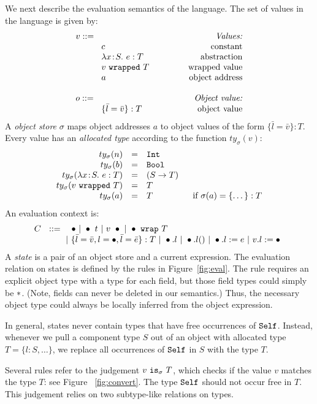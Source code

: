 \documentclass{article}
\newcommand{\lam}[4]{\lambda#1\!:\!#2.\,\,#4:#3}
\newcommand{\lamt}[2]{#1\rightarrow #2}
\newcommand{\app}[2]{#1~#2}
\newcommand{\Int}{\t{Int}}
\newcommand{\Bool}{\t{Bool}}
\newcommand{\dynamic}{\t{*}}
\newcommand{\hole}{\bullet}
\renewcommand{\t}[1]{{\tt #1}}
\newcommand{\objty}[1]{\{#1\}}
\newcommand{\obje}[2]{\{#1\}:{#2}}
\newcommand{\objget}[2]{#1.#2}
\newcommand{\objcall}[2]{#1.#2()}
\newcommand{\objset}[3]{#1.#2:=#3}
\newcommand{\wrapv}[2]{#1~\t{wrapped}~#2}
\newcommand{\wrap}[2]{#1~\t{wrap}~#2}
\newcommand{\allocty}[1]{ty_{\sigma}(#1)}
\newcommand{\istype}[2]{#1~\t{is}_{\sigma}~ #2}
\newcommand{\self}{\t{Self}}
\begin{document}
We next describe the evaluation semantics of the language. 
The set of values in the language is given by:
\[
\begin{array}{llr}
	\mydefhead{v ::=\qquad\qquad\qquad\qquad\qquad}{Values:} 
	\mydefcase{c								}{constant} 
	\mydefcase{\lam{x}{S}{T}{e} 				}{abstraction} 
	\mydefcase{\wrapv{v}{T}	 				}{wrapped value} 
	\mydefcase{a								}{object address}
	\\
	\mydefhead{o ::=\qquad\qquad\qquad\qquad\qquad}{Object value:} 
	\mydefcase{\obje{\bar l = \bar v}{T}		}{object value}
\end{array}
\]
A \emph{object store} $\sigma$ maps object addresses $a$ to object values of the form $\obje{\bar{l}=\bar v}{T}$.
Every value has an \emph{allocated type} according to the function $\allocty{v}$:
\[
\begin{array}{rcll}
		\allocty{n}&=&\Int \\
		\allocty{b}&=&\Bool\\
		\allocty{\lam{x}{S}{T}{e}}&=&(\lamt{S}{T})\\
		\allocty{\wrapv{v}{T}}&=&T\\
		\allocty{a}&=&T   &\mbox{~~if } 		\sigma(a)=\obje{\dots}{T}
\end{array}
\]
An evaluation context is:
\[
C ~~::=
\begin{array}[t]{@{}l}
		~~~\hole
	~|~	\app{\hole}{t} 
	~|~	\app{v}{\hole}
	~|~ \wrap{\hole}{T} \\
	~|~ \obje{\bar l=\bar v,l=\hole, \bar l =\bar e}{T}
	~|~ \objget{\hole}{l}
	~|~ \objcall{\hole}{l}
	~|~ \objset{\hole}{l}{e}
	~|~ \objset{v}{l}{\hole} 
\end{array}
\]
A \emph{state} is a pair of an object store and a current expression.
The evaluation relation on states is defined by the rules in Figure~\ref{fig:eval}.
The rule  requires an explicit object type with a type for each field,
but those field types could simply be $\dynamic$. (Note, fields can never be deleted in our semantics.)
Thus, the necessary object type could always be locally inferred from the object expression.

In general, states never contain types that have free occurrences of $\self$. 
Instead, whenever we pull a component type $S$ out of an object with allocated type $T=\objty{l:S,\dots}$, 
we replace all occurrences of $\self$ in $S$ with the type $T$.

Several rules refer to the judgement $\istype{v}{T}$, which checks if the value $v$ matches the type $T$: 
see  Figure ~\ref{fig:convert}. The type $\self$ should not occur free in $T$.
This judgement relies on two subtype-like relations on types.
\end{document}
